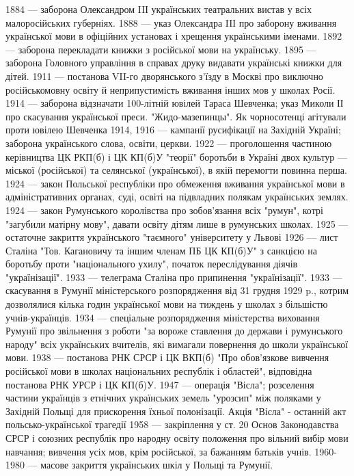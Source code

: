 1884 — заборона Олександром IIІ українських театральних вистав у всіх малоросійських губерніях.
1888 — указ Олександра IIІ про заборону вживання української мови в офіційних установах і хрещення українськими іменами.
1892 — заборона перекладати книжки з російської мови на українську.
1895 — заборона Головного управління в справах друку видавати українські книжки для дітей.
1911 — постанова VII-го дворянського з'їзду в Москві про виключно російськомовну освіту й неприпустимість вживання інших мов у школах Росії.
1914 — заборона відзначати 100-літній ювілей Тараса Шевченка; указ Миколи ІІ про скасування української преси.
"Жидо-мазепинцы". Як чорносотенці агітували проти ювілею Шевченка
1914, 1916 — кампанії русифікації на Західній Україні; заборона українського слова, освіти, церкви.
1922 — проголошення частиною керівництва ЦК РКП(б) і ЦК КП(б)У "теорії" боротьби в Україні двох культур — міської (російської) та селянської (української), в якій перемогти повинна перша.
1924 — закон Польської республіки про обмеження вживання української мови в адміністративних органах, суді, освіті на підвладних полякам українських землях.
1924 — закон Румунського королівства про зобов'язання всіх "румун", котрі "загубили матірну мову", давати освіту дітям лише в румунських школах.
1925 — остаточне закриття українського "таємного" університету у Львові
1926 — лист Сталіна "Тов. Кагановичу та іншим членам ПБ ЦК КП(б)У" з санкцією на боротьбу проти "національного ухилу", початок переслідування діячів "українізації".
1933 — телеграма Сталіна про припинення "українізації".
1933 — скасування в Румунії міністерського розпорядження від 31 грудня 1929 p., котрим дозволялися кілька годин української мови на тиждень у школах з більшістю учнів-українців.
1934 — спеціальне розпорядження міністерства виховання Румунії про звільнення з роботи "за вороже ставлення до держави і румунського народу" всіх українських вчителів, які вимагали повернення до школи української мови.
1938 — постанова РНК СРСР і ЦК ВКП(б) "Про обов'язкове вивчення російської мови в школах національних республік і областей", відповідна постанова РНК УРСР і ЦК КП(б)У.
1947 — операція "Вісла"; розселення частини українців з етнічних українських земель "урозсип" між поляками у Західній Польщі для прискорення їхньої полонізації.
Акція "Вісла" - останній акт польсько-української трагедії
1958 — закріплення у ст. 20 Основ Законодавства СРСР і союзних республік про народну освіту положення про вільний вибір мови навчання; вивчення усіх мов, крім російської, за бажанням батьків учнів.
1960-1980 — масове закриття українських шкіл у Польщі та Румунії.
